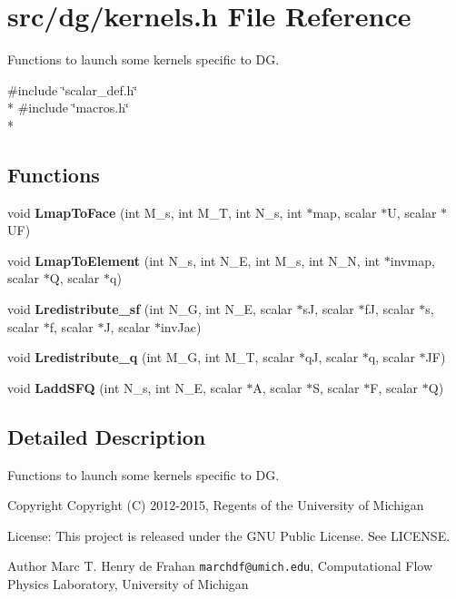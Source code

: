\section{src/dg/kernels.h File Reference}
\label{kernels_8h}


Functions to launch some kernels specific to D\-G.  


{\ttfamily \#include \char`\"{}scalar\-\_\-def.\-h\char`\"{}}\\*
{\ttfamily \#include \char`\"{}macros.\-h\char`\"{}}\\*
\subsection*{Functions}
\begin{DoxyCompactItemize}
\item 
void {\bf Lmap\-To\-Face} (int M\-\_\-s, int M\-\_\-\-T, int N\-\_\-s, int $\ast$map, scalar $\ast$U, scalar $\ast$U\-F)
\item 
void {\bf Lmap\-To\-Element} (int N\-\_\-s, int N\-\_\-\-E, int M\-\_\-s, int N\-\_\-\-N, int $\ast$invmap, scalar $\ast$Q, scalar $\ast$q)
\item 
void {\bf Lredistribute\-\_\-sf} (int N\-\_\-\-G, int N\-\_\-\-E, scalar $\ast$s\-J, scalar $\ast$f\-J, scalar $\ast$s, scalar $\ast$f, scalar $\ast$J, scalar $\ast$inv\-Jac)
\item 
void {\bf Lredistribute\-\_\-q} (int M\-\_\-\-G, int M\-\_\-\-T, scalar $\ast$q\-J, scalar $\ast$q, scalar $\ast$J\-F)
\item 
void {\bf Ladd\-S\-F\-Q} (int N\-\_\-s, int N\-\_\-\-E, scalar $\ast$A, scalar $\ast$S, scalar $\ast$F, scalar $\ast$Q)
\end{DoxyCompactItemize}


\subsection{Detailed Description}
Functions to launch some kernels specific to D\-G. \begin{DoxyCopyright}{Copyright}
Copyright (C) 2012-\/2015, Regents of the University of Michigan 
\end{DoxyCopyright}
\begin{DoxyParagraph}{License\-:}
This project is released under the G\-N\-U Public License. See L\-I\-C\-E\-N\-S\-E. 
\end{DoxyParagraph}
\begin{DoxyAuthor}{Author}
Marc T. Henry de Frahan {\tt marchdf@umich.\-edu}, Computational Flow Physics Laboratory, University of Michigan 
\end{DoxyAuthor}


